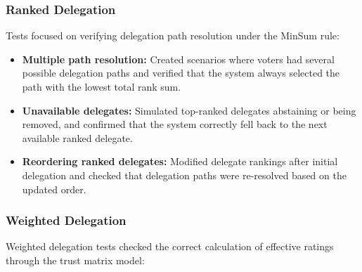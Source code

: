 \subsubsection{Ranked Delegation}
Tests focused on verifying delegation path resolution under the MinSum rule:
\begin{itemize}
    \item\textbf{Multiple path resolution:} Created scenarios where voters had several possible delegation paths and verified that the system always selected the path with the lowest total rank sum.

    \item\textbf{Unavailable delegates:} Simulated top-ranked delegates abstaining or being removed, and confirmed that the system correctly fell back to the next available ranked delegate.

    \item\textbf{Reordering ranked delegates:} Modified delegate rankings after initial delegation and checked that delegation paths were re-resolved based on the updated order.
\end{itemize}

\subsubsection{Weighted Delegation}
Weighted delegation tests checked the correct calculation of effective ratings through the trust matrix model:

